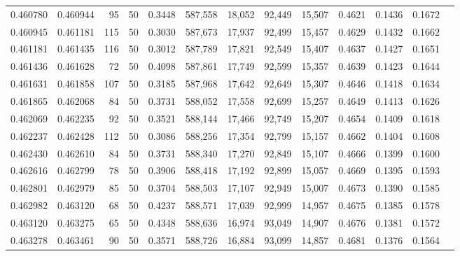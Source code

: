\begin{tabular}{rrrrrrrrrrrrr}
0.460780 & 0.460944 &    95 &  50 &                                     0.3448 & 587,558 &  18,052 &  92,449 &  15,507 & 0.4621 & 0.1436 & 0.1672 \\
0.460945 & 0.461181 &   115 &  50 &                                     0.3030 & 587,673 &  17,937 &  92,499 &  15,457 & 0.4629 & 0.1432 & 0.1662 \\
0.461181 & 0.461435 &   116 &  50 &                                     0.3012 & 587,789 &  17,821 &  92,549 &  15,407 & 0.4637 & 0.1427 & 0.1651 \\
0.461436 & 0.461628 &    72 &  50 &                                     0.4098 & 587,861 &  17,749 &  92,599 &  15,357 & 0.4639 & 0.1423 & 0.1644 \\
0.461631 & 0.461858 &   107 &  50 &                                     0.3185 & 587,968 &  17,642 &  92,649 &  15,307 & 0.4646 & 0.1418 & 0.1634 \\
0.461865 & 0.462068 &    84 &  50 &                                     0.3731 & 588,052 &  17,558 &  92,699 &  15,257 & 0.4649 & 0.1413 & 0.1626 \\
0.462069 & 0.462235 &    92 &  50 &                                     0.3521 & 588,144 &  17,466 &  92,749 &  15,207 & 0.4654 & 0.1409 & 0.1618 \\
0.462237 & 0.462428 &   112 &  50 &                                     0.3086 & 588,256 &  17,354 &  92,799 &  15,157 & 0.4662 & 0.1404 & 0.1608 \\
0.462430 & 0.462610 &    84 &  50 &                                     0.3731 & 588,340 &  17,270 &  92,849 &  15,107 & 0.4666 & 0.1399 & 0.1600 \\
0.462616 & 0.462799 &    78 &  50 &                                     0.3906 & 588,418 &  17,192 &  92,899 &  15,057 & 0.4669 & 0.1395 & 0.1593 \\
0.462801 & 0.462979 &    85 &  50 &                                     0.3704 & 588,503 &  17,107 &  92,949 &  15,007 & 0.4673 & 0.1390 & 0.1585 \\
0.462982 & 0.463120 &    68 &  50 &                                     0.4237 & 588,571 &  17,039 &  92,999 &  14,957 & 0.4675 & 0.1385 & 0.1578 \\
0.463120 & 0.463275 &    65 &  50 &                                     0.4348 & 588,636 &  16,974 &  93,049 &  14,907 & 0.4676 & 0.1381 & 0.1572 \\
0.463278 & 0.463461 &    90 &  50 &                                     0.3571 & 588,726 &  16,884 &  93,099 &  14,857 & 0.4681 & 0.1376 & 0.1564 \\

\end{tabular}
